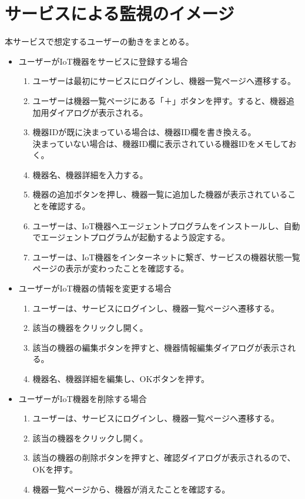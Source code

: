 \section{サービスによる監視のイメージ}
本サービスで想定するユーザーの動きをまとめる。
\begin{itemize}
\item ユーザーがIoT機器をサービスに登録する場合
	\begin{enumerate}
	\item ユーザーは最初にサービスにログインし、機器一覧ページへ遷移する。
	\item ユーザーは機器一覧ページにある「＋」ボタンを押す。すると、機器追加用ダイアログが表示される。
	\item 機器IDが既に決まっている場合は、機器ID欄を書き換える。\\
		決まっていない場合は、機器ID欄に表示されている機器IDをメモしておく。
	\item 機器名、機器詳細を入力する。
	\item 機器の追加ボタンを押し、機器一覧に追加した機器が表示されていることを確認する。
	\item ユーザーは、IoT機器へエージェントプログラムをインストールし、自動でエージェントプログラムが起動するよう設定する。
	\item ユーザーは、IoT機器をインターネットに繋ぎ、サービスの機器状態一覧ページの表示が変わったことを確認する。
	\end{enumerate}
\item ユーザーがIoT機器の情報を変更する場合
	\begin{enumerate}
	\item ユーザーは、サービスにログインし、機器一覧ページへ遷移する。
	\item 該当の機器をクリックし開く。
	\item 該当の機器の編集ボタンを押すと、機器情報編集ダイアログが表示される。
	\item 機器名、機器詳細を編集し、OKボタンを押す。
	\end{enumerate}
\item ユーザーがIoT機器を削除する場合
	\begin{enumerate}
	\item ユーザーは、サービスにログインし、機器一覧ページへ遷移する。
	\item 該当の機器をクリックし開く。
	\item 該当の機器の削除ボタンを押すと、確認ダイアログが表示されるので、OKを押す。
	\item 機器一覧ページから、機器が消えたことを確認する。

\end{enumerate}
\end{itemize}
